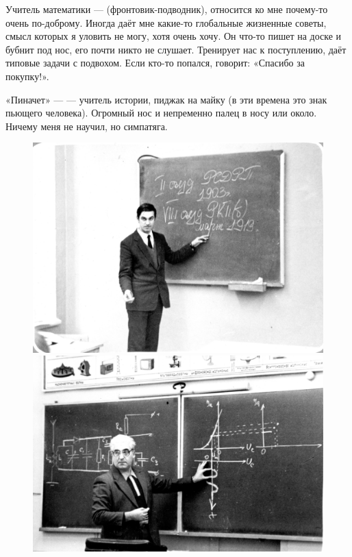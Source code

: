 \documentclass{book}
\begin{document}
{\sloppy 

Учитель математики ---  (фронтовик-подводник),
относится ко мне почему-то очень по-доброму.
Иногда даёт мне какие-то глобальные жизненные советы, 
смысл которых я уловить не могу, хотя очень хочу.
Он что-то пишет на доске и бубнит под нос,
его почти никто не слушает.
Тренирует нас к поступлению,
даёт типовые задачи с подвохом.
Если кто-то попался, говорит: «Спасибо за покупку!».

}

«Пиначет» ---  --- учитель истории, пиджак на майку
(в эти времена это знак пьющего человека).
Огромный нос и непременно палец в носу или около.
Ничему меня не научил, но симпатяга.

\begin{figure}[!ht]
\begin{minipage}{.49\textwidth}
\centering
\includegraphics[scale=.5]{pics/pinachet}
\end{minipage}
\hfill
\begin{minipage}{.49\textwidth}
\centering
\includegraphics[scale=.5]{pics/slutzkij}
\end{minipage}
\end{figure}
\end{document}

